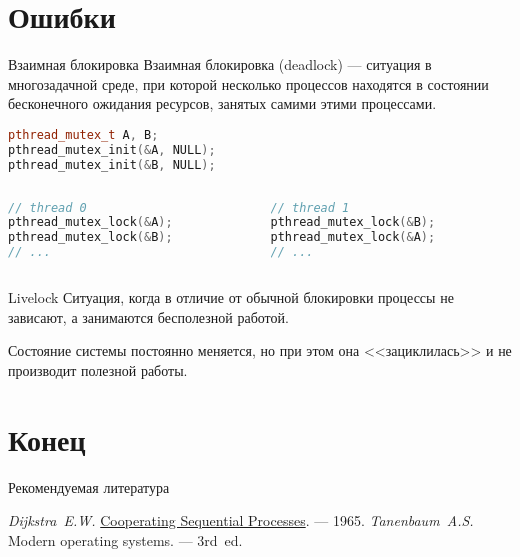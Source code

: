 \section{Ошибки}

\begin{frame}[fragile]{Взаимная блокировка}
Взаимная блокировка (\abbr deadlock) --- ситуация в многозадачной среде, при которой несколько процессов находятся в состоянии бесконечного ожидания ресурсов, занятых самими этими процессами.
\vfill
\begin{lstlisting}[language=C++,basicstyle=\ttfamily,keywordstyle=\color{blue},basicstyle=\footnotesize]
pthread_mutex_t A, B;
pthread_mutex_init(&A, NULL);
pthread_mutex_init(&B, NULL);
\end{lstlisting}

\begin{columns}[t]
    \begin{column}[T]{0.45\textwidth}
        \begin{lstlisting}[language=C++,basicstyle=\ttfamily,keywordstyle=\color{blue},basicstyle=\scriptsize]
// thread 0
pthread_mutex_lock(&A);
pthread_mutex_lock(&B);
// ...
        \end{lstlisting}
    \end{column}
    \begin{column}[T]{0.45\textwidth}
        \begin{lstlisting}[language=C++,basicstyle=\ttfamily,keywordstyle=\color{blue},basicstyle=\scriptsize]
// thread 1
pthread_mutex_lock(&B);
pthread_mutex_lock(&A);
// ...
        \end{lstlisting}
    \end{column}
\end{columns}
\end{frame}

\begin{frame}{Livelock}
Ситуация, когда в отличие от обычной блокировки процессы не зависают, а занимаются бесполезной работой.
\vspace*{0.5cm}

Состояние системы постоянно меняется, но при этом она <<зациклилась>> и не производит полезной работы.
\end{frame}

\section*{Конец}

\begin{frame}[allowframebreaks]{Рекомендуемая литература}
\begin{thebibliography}{99}
    \bibitem{} \textit{Dijkstra~E.W.}
    \href{http://www.cs.utexas.edu/users/EWD/transcriptions/EWD01xx/EWD123.html}{Cooperating
    Sequential Processes}. --- 1965.
    \bibitem{} \textit{Tanenbaum~A.S.} Modern operating systems. --- 3rd~ed.
\end{thebibliography}
\end{frame}

